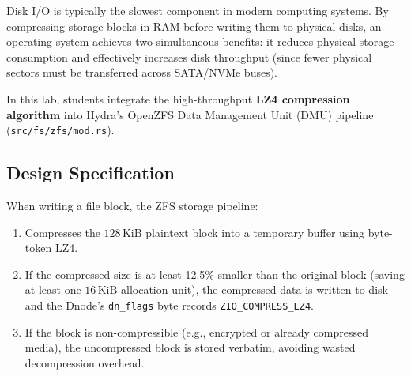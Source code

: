 Disk I/O is typically the slowest component in modern computing systems. By compressing storage blocks in RAM before writing them to physical disks, an operating system achieves two simultaneous benefits: it reduces physical storage consumption and effectively increases disk throughput (since fewer physical sectors must be transferred across SATA/NVMe buses).

In this lab, students integrate the high-throughput \textbf{LZ4 compression algorithm} into Hydra's OpenZFS Data Management Unit (DMU) pipeline (\texttt{src/fs/zfs/mod.rs}).

\subsection{Design Specification}

When writing a file block, the ZFS storage pipeline:
\begin{enumerate}
    \item Compresses the $128\,\text{KiB}$ plaintext block into a temporary buffer using byte-token LZ4.
    \item If the compressed size is at least 12.5\% smaller than the original block (saving at least one $16\,\text{KiB}$ allocation unit), the compressed data is written to disk and the Dnode's \texttt{dn\_flags} byte records \texttt{ZIO\_COMPRESS\_LZ4}.
    \item If the block is non-compressible (e.g., encrypted or already compressed media), the uncompressed block is stored verbatim, avoiding wasted decompression overhead.
\end{enumerate}

